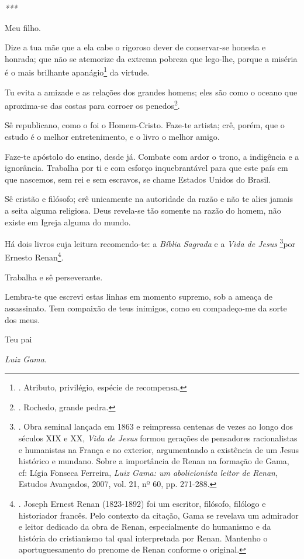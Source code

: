 \emph{***}

Meu filho.

Dize a tua mãe que a ela cabe o rigoroso dever de conservar-se honesta e
honrada; que não se atemorize da extrema pobreza que lego-lhe, porque a
miséria é o mais brilhante apanágio\footnote{. Atributo, privilégio,
  espécie de recompensa.} da virtude.

Tu evita a amizade e as relações dos grandes homens; eles são como o
oceano que aproxima-se das costas para corroer os penedos\footnote{.
  Rochedo, grande pedra.}.

Sê republicano, como o foi o Homem-Cristo. Faze-te artista; crê, porém,
que o estudo é o melhor entretenimento, e o livro o melhor amigo.

Faze-te apóstolo do ensino, desde já. Combate com ardor o trono, a
indigência e a ignorância. Trabalha por ti e com esforço inquebrantável
para que este país em que nascemos, sem rei e sem escravos, se chame
Estados Unidos do Brasil.

Sê cristão e filósofo; crê unicamente na autoridade da razão e não te
alies jamais a seita alguma religiosa. Deus revela-se tão somente na
razão do homem, não existe em Igreja alguma do mundo.

Há dois livros cuja leitura recomendo-te: a \emph{Bíblia Sagrada} e a
\emph{Vida de Jesus} \footnote{. Obra seminal lançada em 1863 e
  reimpressa centenas de vezes ao longo dos séculos XIX e XX, \emph{Vida
  de Jesus} formou gerações de pensadores racionalistas e humanistas na
  França e no exterior, argumentando a existência de um Jesus histórico
  e mundano. Sobre a importância de Renan na formação de Gama, cf: Lígia
  Fonseca Ferreira, \emph{Luiz Gama: um abolicionista leitor de Renan},
  Estudos Avançados, 2007, vol. 21, nº 60, pp. 271-288.}por Ernesto
Renan\footnote{. Joseph Ernest Renan (1823-1892) foi um escritor,
  filósofo, filólogo e historiador francês. Pelo contexto da citação,
  Gama se revelava um admirador e leitor dedicado da obra de Renan,
  especialmente do humanismo e da história do cristianismo tal qual
  interpretada por Renan. Mantenho o aportuguesamento do prenome de
  Renan conforme o original.}.

Trabalha e sê perseverante.

Lembra-te que escrevi estas linhas em momento supremo, sob a ameaça de
assassinato. Tem compaixão de teus inimigos, como eu compadeço-me da
sorte dos meus.

Teu pai

\emph{Luiz Gama}.

